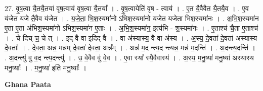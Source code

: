 \documentclass[17pt]{extarticle}
\begin{document}
27. वृ॒ष॒त्वा यै॒तयै॒तया॑ वृष॒त्वाय॑ वृष॒त्वा यै॒तया᳚ । . वृ॒ष॒त्वायेति॑ वृष - त्वाय॑ । . ए॒त यै॒वैवैत यै॒तयै॒व । . ए॒व य॑जेत यजे तै॒वैव य॑जेत । . य॒जे॒ता॒ भि॒श॒स्यमा॑नो ऽभिश॒स्यमा॑नो यजेत यजेता भिश॒स्यमा॑नः । . अ॒भि॒श॒स्यमा॑न ए॒ता ए॒ता अ॑भिश॒स्यमा॑नो ऽभिश॒स्यमा॑न ए॒ताः । . अ॒भि॒श॒स्यमा॑न॒ इत्य॑भि - श॒स्यमा॑नः । . ए॒ताश्च॑ चै॒ता ए॒ताश्च॑ । . चे दिच् च॒ चे त् । . इद् वै वा इदिद् वै । . वा अ॑स्यास्य॒ वै वा अ॑स्य । . अ॒स्य॒ दे॒वता॑ दे॒वता॑ अस्यास्य दे॒वताः᳚ । . दे॒वता॒ अन्न॒ मन्न॑म् दे॒वता॑ दे॒वता॒ अन्न᳚म् । . अन्न॑ म॒द न्त्य॒द न्त्यन्न॒ मन्न॑ म॒दन्ति॑ । . अ॒दन्त्य॒दन्ति॑ । . अ॒दन्त्यु॑ वु व॒द न्त्य॒दन्त्यु॑ । . उ॒ वे॒वैव वु॑ वे॒व । . ए॒वा स्या᳚ स्यै॒वैवास्य॑ । . अ॒स्य॒ म॒नु॒ष्या॑ मनु॒ष्या॑ अस्यास्य मनु॒ष्याः᳚ । . म॒नु॒ष्या॑ इति॑ मनु॒ष्याः᳚ । \newline

\textbf{Ghana Paata } \newline
\end{document}
